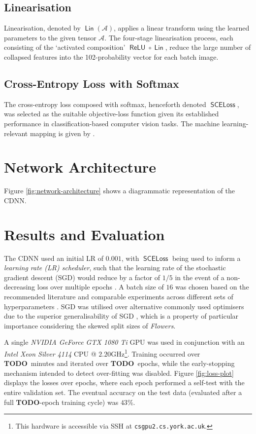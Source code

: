 \documentclass[journal]{IEEEtran}
\DeclareMathOperator\relu{\mathsf{ReLU}}
\DeclareMathOperator\linear{\mathsf{Lin}}
\DeclareMathOperator\loss{\mathsf{SCELoss}}
\newcommand\networkperformance{43}
\newcommand\trainingtime{\textbf{TODO}}
\newcommand\trainingepochcount{\textbf{TODO}}
\begin{document}
\subsection{Linearisation}
Linearisation, denoted by $\linear(\mathcal{A})$, applies a linear transform
using the learned parameters to the given tensor $\mathcal{A}$. The four-stage
linearisation process, each consisting of the `activated composition' $\relu
\circ \linear$, reduce the large number of collapsed features into the
102-probability vector for each batch image.

\subsection{Cross-Entropy Loss with Softmax}
The cross-entropy loss composed with softmax, henceforth denoted $\loss$, was
selected as the suitable objective-loss function given its established
performance in classification-based computer vision tasks. The machine
learning-relevant mapping is given by \cite{Jie:2018}.

\section{Network Architecture}
Figure \ref{fig:network-architecture} shows a diagrammatic representation of the
CDNN.

\section{Results and Evaluation}
The CDNN used an initial LR of $0.001$, with $\loss$ being used to inform a
\emph{learning rate (LR) scheduler}, such that the learning rate of the
stochastic gradient descent (SGD) would reduce by a factor of $1/5$ in the event
of a non-decreasing loss over multiple epochs \cite{Konar:2020}. A batch size of
$16$ was chosen based on the recommended literature and comparable experiments
across different sets of hyperparameters \cite{Kandel:2020}. SGD was utilised
over alternative commonly used optimisers due to the superior generalisability
of SGD \cite{Hardt:2016}, which is a property of particular importance
considering the skewed split sizes of \emph{Flowers}.

A single \emph{NVIDIA GeForce GTX 1080 Ti} GPU was used in conjunction with an
\emph{Intel Xeon Silver 4114} CPU @ $2.20$GHz\footnote{This hardware is
accessible via SSH at \texttt{csgpu2.cs.york.ac.uk}.}. Training occurred over
\trainingtime\ minutes and iterated over \trainingepochcount\ epochs, while the
early-stopping mechanism intended to detect over-fitting was disabled. Figure
\ref{fig:loss-plot} displays the losses over epochs, where each epoch performed
a self-test with the entire validation set.  The eventual accuracy on the test
data (evaluated after a full \trainingepochcount{}-epoch training cycle) was
$\networkperformance$\%.
\end{document}
